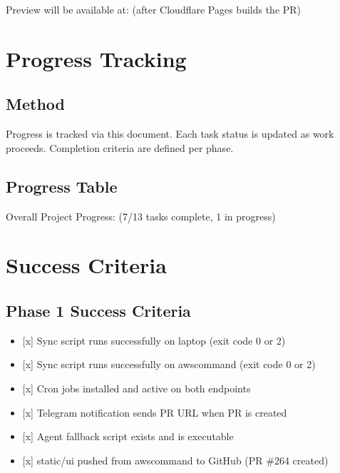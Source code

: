 \documentclass[letterpaper,10pt,openany,oneside,english]{sphinxmanual}
\begin{document}
\sphinxAtStartPar
Preview will be available at:
(after Cloudflare Pages builds the PR)

\sphinxstepscope


\section{Progress Tracking}
\label{\detokenize{progress_tracking:progress-tracking}}\label{\detokenize{progress_tracking::doc}}

\subsection{Method}
\label{\detokenize{progress_tracking:method}}
\sphinxAtStartPar
Progress is tracked via this document. Each task status is updated as work
proceeds. Completion criteria are defined per phase.


\subsection{Progress Table}
\label{\detokenize{progress_tracking:progress-table}}
\sphinxAtStartPar
Overall Project Progress:  (7/13 tasks complete, 1 in progress)

\sphinxstepscope


\section{Success Criteria}
\label{\detokenize{success_criteria:success-criteria}}\label{\detokenize{success_criteria::doc}}

\subsection{Phase 1 Success Criteria}
\label{\detokenize{success_criteria:phase-1-success-criteria}}\begin{itemize}
\item {} 
\sphinxAtStartPar
{[}x{]} Sync script runs successfully on laptop (exit code 0 or 2)

\item {} 
\sphinxAtStartPar
{[}x{]} Sync script runs successfully on aws\sphinxhyphen{}command (exit code 0 or 2)

\item {} 
\sphinxAtStartPar
{[}x{]} Cron jobs installed and active on both endpoints

\item {} 
\sphinxAtStartPar
{[}x{]} Telegram notification sends PR URL when PR is created

\item {} 
\sphinxAtStartPar
{[}x{]} Agent fallback script exists and is executable

\item {} 
\sphinxAtStartPar
{[}x{]} static/ui pushed from aws\sphinxhyphen{}command to GitHub (PR \#264 created)

\end{itemize}
\end{document}
